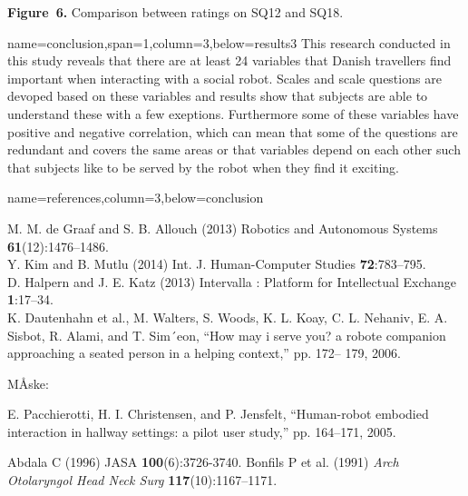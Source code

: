 \documentclass[paperwidth=118cm,paperheight=84cm,landscape,fontscale=0.2941]{baposter}
\begin{document}
\begin{poster}
{\textbf{Figure~6. }Comparison between ratings on SQ12 and SQ18.
}

{name=conclusion,span=1,column=3,below=results3}
{\parskip 5pt
This research conducted in this study reveals that there are at least 24 variables that Danish travellers find important when interacting with a social robot. Scales and scale questions are devoped based on these variables and results show that subjects are able to understand these with a few exeptions. Furthermore some of these variables have positive and negative correlation, which can mean that some of the questions are redundant and covers the same areas or that variables depend on each other such that subjects like to be served by the robot when they find it exciting.
}




{name=references,column=3,below=conclusion}
{
\renewcommand{\section}[2]{}%
\footnotesize


M. M. de Graaf and S. B. Allouch (2013) Robotics and Autonomous
Systems \textbf{61}(12):1476–1486.\\

Y. Kim and B. Mutlu (2014) Int. J. Human-Computer Studies \textbf{72}:783–795.\\

D. Halpern and J. E. Katz (2013) Intervalla : Platform for Intellectual Exchange \textbf{1}:17–34.\\

K. Dautenhahn et al., M. Walters, S. Woods, K. L. Koay, C. L. Nehaniv, E. A.
Sisbot, R. Alami, and T. Sim´eon, “How may i serve you? a robote
companion approaching a seated person in a helping context,” pp. 172–
179, 2006.

MÅske:

E. Pacchierotti, H. I. Christensen, and P. Jensfelt, “Human-robot embodied
interaction in hallway settings: a pilot user study,” pp. 164–171,
2005.


Abdala C (1996) JASA \textbf{100}(6):3726-3740.
Bonfils P et al. (1991) \textit{Arch Otolaryngol Head Neck Surg} \textbf{117}(10):1167–1171.
}



\end{poster}
\end{document}
